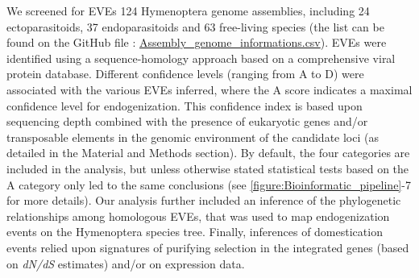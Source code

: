 We screened for EVEs 124 Hymenoptera genome assemblies, including 24 ectoparasitoids, 37 endoparasitoids and 63 free-living species (the list can be found on the GitHub file : \href{https://github.com/BenjaminGuinet/PhD_defense/blob/main/Supplementary_paper1/Assembly_genome_informations.csv}{Assembly\_genome\_informations.csv}). EVEs were identified using a sequence-homology approach based on a comprehensive viral protein database. Different confidence levels (ranging from A to D) were associated with the various EVEs inferred, where the A score indicates a maximal confidence level for endogenization. This confidence index is based upon sequencing depth combined with the presence of eukaryotic genes and/or transposable elements in the genomic environment of the candidate loci (as detailed in the Material and Methods section). By default, the four categories are included in the analysis, but unless otherwise stated statistical tests based on the A category only led to the same conclusions (see \figurename{\ref{figure:Bioinformatic_pipeline}}-7 for more details). Our analysis further included an inference of the phylogenetic relationships among homologous EVEs, that was used to map endogenization events on the Hymenoptera species tree. Finally, inferences of domestication events relied upon signatures of purifying selection in the integrated genes (based on \textit{dN/dS} estimates) and/or on expression data.

